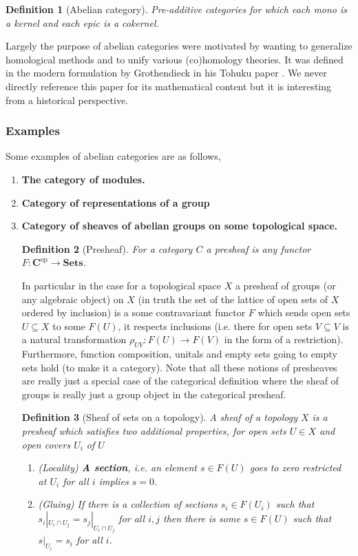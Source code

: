 \documentclass[12pt]{article}
\numberwithin{equation}{section}
\newtheorem{definition}{Definition}[section]
\begin{document}
\begin{appendices}
	
	\begin{definition}[Abelian category]
		Pre-additive categories for which each mono is a kernel and each epic is a cokernel.
	\end{definition}
	Largely the purpose of abelian categories were motivated by wanting to generalize homological methods and to unify various (co)homology theories. It was defined in the modern formulation by Grothendieck in his Tohuku paper \cite{grothendieck1957quelques}. We never directly reference this paper for its mathematical content but it is interesting from a historical perspective.
	\subsubsection{Examples}
	Some examples of abelian categories are as follows,
	\begin{enumerate}
		\item \textbf{The category of modules.}
		\item\textbf{Category of representations of a group}
		\item \textbf{Category of sheaves of abelian groups on some topological space.}
		
		\begin{definition}[Presheaf]
			For a category $C$ a presheaf is any functor $F: \mathbf{C}^{\mathrm{op}}\to \mathbf{Sets}$.
		\end{definition}
		In particular in the case for a topological space $X$ a presheaf of groups (or any algebraic object) on $X$ (in truth the set of the lattice of open sets of $X$ ordered by inclusion) is a some contravariant functor $F$ which sends open sets $U \subseteq X$ to some $F(U)$, it respects inclusions (i.e. there for open sets $V \subseteq V $ is a natural transformation $\rho_{UV}: F(U)\to F(V)$ in the form of a restriction). Furthermore, function composition, unitals and empty sets going to empty sets hold (to make it a category). Note that all these notions of presheaves are really just a special case of the categorical definition where the sheaf of groups is really just a group object in the categorical presheaf.
		\begin{definition}[Sheaf of sets on a topology]
			A sheaf of a topology $X$ is a presheaf which satisfies two additional properties, for open sets $U \in X$ and open covers ${U_i}$ of $U$
			\begin{enumerate}
				\item (Locality)  \textbf{A section}, i.e. an element $s \in F(U)$ goes to zero restricted at $U_i$ for all $i$ implies $s=0$.
				\item (Gluing) If there is a collection of sections $s_i \in F(U_i)$ such that $s_i|_{U_i \cap U_j}=s_j|_{U_i \cap U_j}$ for all $i,j$ then there is some $s \in F(U)$ such that $s|_{U_i}=s_i$ for all $i$.
			\end{enumerate}
			

\end{definition}
\end{enumerate}
\end{appendices}
\end{document}
